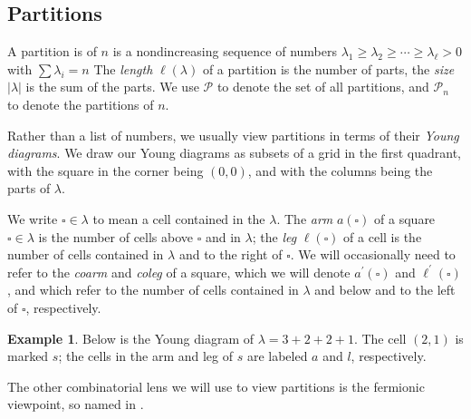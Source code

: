 \documentclass{amsart}[12pt]
\theoremstyle{definition}
\newtheorem{example}[dummy]{Example}
\newcommand{\PP}{\mathcal{P}} %
\begin{document}
\subsection{Partitions}


A partition is of $n$ is a nondincreasing sequence of numbers $\lambda_1\geq \lambda_2\geq \cdots \geq \lambda_\ell > 0$ with $\sum \lambda_i=n$  The \emph{length} $\ell(\lambda)$ of a partition is the number of parts, the \emph{size} $|\lambda|$ is the sum of the parts.  We use $\PP$ to denote the set of all partitions, and $\PP_n$ to denote the partitions of $n$.

Rather than a list of numbers, we usually view partitions in terms of their \emph{Young diagrams}.  We draw our Young diagrams as subsets of a grid in the first quadrant, with the square in the corner being $(0,0)$, and with the columns being the parts of $\lambda$.

We write $\square\in\lambda$ to mean a cell contained in the $\lambda$.  The \emph{arm} $a(\square)$ of a square $\square\in\lambda$ is the number of cells above $\square$ and in $\lambda$; the \emph{leg} $\ell(\square)$ of a cell is the number of cells contained in $\lambda$ and to the right of $\square$.  We will occasionally need to refer to the \emph{coarm} and \emph{coleg} of a square, which we will denote $a^\prime(\square)$ and $\ell^\prime(\square)$, and which refer to the number of cells contained in $\lambda$ and below and to the left of $\square$, respectively. 

\begin{example}
Below is the Young diagram of $\lambda=3+2+2+1$.  The cell $(2,1)$ is marked $s$; the cells in the arm and leg of $s$ are labeled $a$ and $l$, respectively.
\begin{center}
\end{center}
\end{example}

The other combinatorial lens we will use to view partitions is the fermionic viewpoint, so named in .  
\end{document}

